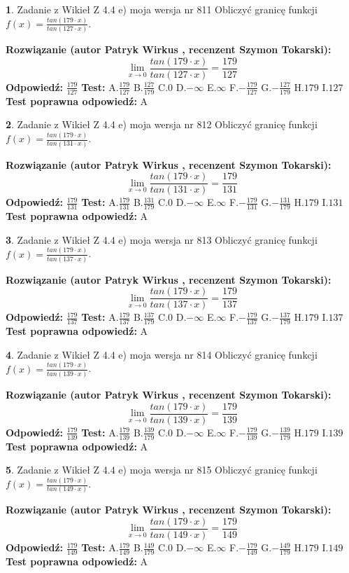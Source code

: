\documentclass[12pt, a4paper]{article}
\theoremstyle{definition} %
\newtheorem{zad}{}
\newcommand{\zadStart}[1]{\begin{zad}#1\newline}
\newcommand{\zadStop}{\end{zad}}
\newcommand{\rozwStart}[2]{\noindent \textbf{Rozwiązanie (autor #1 , recenzent #2): }\newline}
\newcommand{\rozwStop}{\newline}
\newcommand{\odpStart}{\noindent \textbf{Odpowiedź:}\newline}
\newcommand{\odpStop}{\newline}
\newcommand{\testStart}{\noindent \textbf{Test:}\newline}
\newcommand{\testStop}{\newline}
\newcommand{\kluczStart}{\noindent \textbf{Test poprawna odpowiedź:}\newline}
\newcommand{\kluczStop}{\newline}
\begin{document}
\zadStart{Zadanie z Wikieł Z 4.4 e) moja wersja nr 811}
Obliczyć granicę funkcji $f(x)=\frac{tan(179\cdot x)}{tan(127\cdot x)}$.
\zadStop
\rozwStart{Patryk Wirkus}{Szymon Tokarski}
$$\lim\limits_{x\to 0}\frac{tan(179\cdot x)}{tan(127\cdot x)}=
\frac{179}{127}$$
\rozwStop
\odpStart
$\frac{179}{127}$
\odpStop
\testStart
A.$\frac{179}{127}$
B.$\frac{127}{179}$
C.$0$
D.$-\infty$
E.$\infty$
F.$-\frac{179}{127}$
G.$-\frac{127}{179}$
H.$179$
I.$127$
\testStop
\kluczStart
A
\kluczStop



\zadStart{Zadanie z Wikieł Z 4.4 e) moja wersja nr 812}
Obliczyć granicę funkcji $f(x)=\frac{tan(179\cdot x)}{tan(131\cdot x)}$.
\zadStop
\rozwStart{Patryk Wirkus}{Szymon Tokarski}
$$\lim\limits_{x\to 0}\frac{tan(179\cdot x)}{tan(131\cdot x)}=
\frac{179}{131}$$
\rozwStop
\odpStart
$\frac{179}{131}$
\odpStop
\testStart
A.$\frac{179}{131}$
B.$\frac{131}{179}$
C.$0$
D.$-\infty$
E.$\infty$
F.$-\frac{179}{131}$
G.$-\frac{131}{179}$
H.$179$
I.$131$
\testStop
\kluczStart
A
\kluczStop



\zadStart{Zadanie z Wikieł Z 4.4 e) moja wersja nr 813}
Obliczyć granicę funkcji $f(x)=\frac{tan(179\cdot x)}{tan(137\cdot x)}$.
\zadStop
\rozwStart{Patryk Wirkus}{Szymon Tokarski}
$$\lim\limits_{x\to 0}\frac{tan(179\cdot x)}{tan(137\cdot x)}=
\frac{179}{137}$$
\rozwStop
\odpStart
$\frac{179}{137}$
\odpStop
\testStart
A.$\frac{179}{137}$
B.$\frac{137}{179}$
C.$0$
D.$-\infty$
E.$\infty$
F.$-\frac{179}{137}$
G.$-\frac{137}{179}$
H.$179$
I.$137$
\testStop
\kluczStart
A
\kluczStop



\zadStart{Zadanie z Wikieł Z 4.4 e) moja wersja nr 814}
Obliczyć granicę funkcji $f(x)=\frac{tan(179\cdot x)}{tan(139\cdot x)}$.
\zadStop
\rozwStart{Patryk Wirkus}{Szymon Tokarski}
$$\lim\limits_{x\to 0}\frac{tan(179\cdot x)}{tan(139\cdot x)}=
\frac{179}{139}$$
\rozwStop
\odpStart
$\frac{179}{139}$
\odpStop
\testStart
A.$\frac{179}{139}$
B.$\frac{139}{179}$
C.$0$
D.$-\infty$
E.$\infty$
F.$-\frac{179}{139}$
G.$-\frac{139}{179}$
H.$179$
I.$139$
\testStop
\kluczStart
A
\kluczStop



\zadStart{Zadanie z Wikieł Z 4.4 e) moja wersja nr 815}
Obliczyć granicę funkcji $f(x)=\frac{tan(179\cdot x)}{tan(149\cdot x)}$.
\zadStop
\rozwStart{Patryk Wirkus}{Szymon Tokarski}
$$\lim\limits_{x\to 0}\frac{tan(179\cdot x)}{tan(149\cdot x)}=
\frac{179}{149}$$
\rozwStop
\odpStart
$\frac{179}{149}$
\odpStop
\testStart
A.$\frac{179}{149}$
B.$\frac{149}{179}$
C.$0$
D.$-\infty$
E.$\infty$
F.$-\frac{179}{149}$
G.$-\frac{149}{179}$
H.$179$
I.$149$
\testStop
\kluczStart
A
\kluczStop
\end{document}
